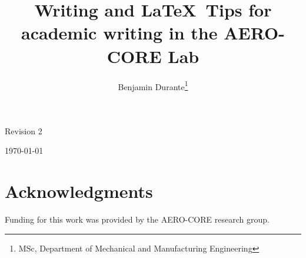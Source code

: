 \documentclass[journal]{new-aiaa} %
\title{Writing and \LaTeX\ Tips for academic writing in the AERO-CORE Lab} %
\author{
	Benjamin Durante\footnote{MSc, Department of Mechanical and Manufacturing Engineering}
}
\affil{University of Calgary, Calgary, Alberta, Canada, T2N 4V8}
\begin{document}

	\maketitle
	\begin{center}
		Revision 2
		
		\today
	\end{center}
	
	\tableofcontents
	\newpage
	
	
	
	
	
	


	\section*{Acknowledgments}
	Funding for this work was provided by the AERO-CORE research group. 

	
	
	
\end{document}
